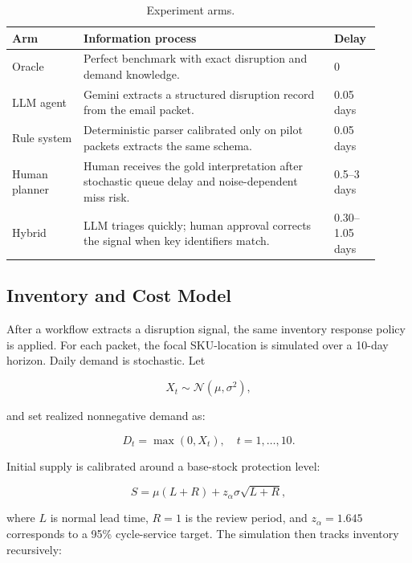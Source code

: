 \documentclass[11pt]{article}
\begin{document}
\begin{table}[H]
\centering
\caption{Experiment arms.}
\label{tab:arms}
\small
\begin{tabular}{@{}p{0.18\linewidth}p{0.63\linewidth}p{0.10\linewidth}@{}}
\toprule
Arm & Information process & Delay \\
\midrule
Oracle & Perfect benchmark with exact disruption and demand knowledge. & 0 \\
LLM agent & Gemini extracts a structured disruption record from the email packet. & 0.05 days \\
Rule system & Deterministic parser calibrated only on pilot packets extracts the same schema. & 0.05 days \\
Human planner & Human receives the gold interpretation after stochastic queue delay and noise-dependent miss risk. & 0.5--3 days \\
Hybrid & LLM triages quickly; human approval corrects the signal when key identifiers match. & 0.30--1.05 days \\
\bottomrule
\end{tabular}
\end{table}

\subsection{Inventory and Cost Model}

After a workflow extracts a disruption signal, the same inventory response policy is applied. For each packet, the focal SKU-location is simulated over a 10-day horizon. Daily demand is stochastic. Let

\begin{equation}
X_t \sim \mathcal{N}(\mu,\sigma^2),
\end{equation}

and set realized nonnegative demand as:

\begin{equation}
D_t=\max(0,X_t), \quad t=1,\ldots,10.
\end{equation}

Initial supply is calibrated around a base-stock protection level:

\begin{equation}
S = \mu(L+R) + z_{\alpha}\sigma\sqrt{L+R},
\end{equation}

where $L$ is normal lead time, $R=1$ is the review period, and $z_{\alpha}=1.645$ corresponds to a 95\% cycle-service target. The simulation then tracks inventory recursively:
\end{document}
